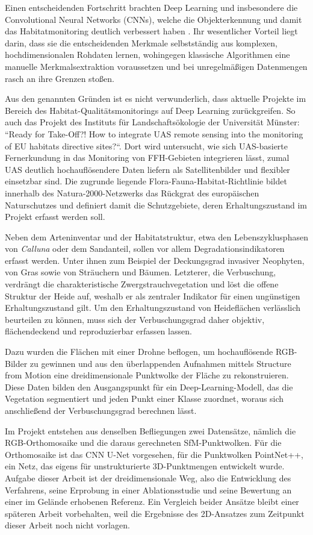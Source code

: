 Einen entscheidenden Fortschritt brachten Deep Learning und insbesondere die Convolutional Neural Networks (CNNs), welche die Objekterkennung und damit das Habitatmonitoring deutlich verbessert haben \cite{Yun.2024}. Ihr wesentlicher Vorteil liegt darin, dass sie die entscheidenden Merkmale selbstständig aus komplexen, hochdimensionalen Rohdaten lernen, wohingegen klassische Algorithmen eine manuelle Merkmalsextraktion voraussetzen und bei unregelmäßigen Datenmengen rasch an ihre Grenzen stoßen.

Aus den genannten Gründen ist es nicht verwunderlich, dass aktuelle Projekte im Bereich des Habitat-Qualitätsmonitorings auf Deep Learning zurückgreifen. So auch das Projekt des Instituts für Landschaftsökologie der Universität Münster: “Ready for Take-Off?! How to integrate UAS remote sensing into the monitoring of EU habitats directive sites?“. Dort wird untersucht, wie sich UAS-basierte Fernerkundung in das Monitoring von FFH-Gebieten integrieren lässt, zumal UAS deutlich hochauflösendere Daten liefern als Satellitenbilder und flexibler einsetzbar sind. Die zugrunde liegende Flora-Fauna-Habitat-Richtlinie bildet innerhalb des Natura-2000-Netzwerks das Rückgrat des europäischen Naturschutzes \cite{RatEG.1992} und definiert damit die Schutzgebiete, deren Erhaltungszustand im Projekt erfasst werden soll.

Neben dem Arteninventar und der Habitatstruktur, etwa den Lebenszyklusphasen von \textit{Calluna} oder dem Sandanteil, sollen vor allem Degradationsindikatoren erfasst werden. Unter ihnen zum Beispiel der Deckungsgrad invasiver Neophyten, von Gras sowie von Sträuchern und Bäumen. Letzterer, die Verbuschung, verdrängt die charakteristische Zwergstrauchvegetation und löst die offene Struktur der Heide auf, weshalb er als zentraler Indikator für einen ungünstigen Erhaltungszustand gilt. Um den Erhaltungszustand von Heideflächen verlässlich beurteilen zu können, muss sich der Verbuschungsgrad daher objektiv, flächendeckend und reproduzierbar erfassen lassen.

Dazu wurden die Flächen mit einer Drohne beflogen, um hochauflösende RGB-Bilder zu gewinnen und aus den überlappenden Aufnahmen mittels Structure from Motion eine dreidimensionale Punktwolke der Fläche zu rekonstruieren. Diese Daten bilden den Ausgangspunkt für ein Deep-Learning-Modell, das die Vegetation segmentiert und jeden Punkt einer Klasse zuordnet, woraus sich anschließend der Verbuschungsgrad berechnen lässt.

Im Projekt entstehen aus denselben Befliegungen zwei Datensätze, nämlich die
RGB-Orthomosaike und die daraus gerechneten SfM-Punktwolken. Für die
Orthomosaike ist das CNN U-Net vorgesehen, für die Punktwolken PointNet++, ein
Netz, das eigens für unstrukturierte 3D-Punktmengen entwickelt wurde. Aufgabe dieser Arbeit ist der dreidimensionale Weg, also die Entwicklung des Verfahrens, seine Erprobung in einer Ablationsstudie und seine Bewertung an einer im Gelände erhobenen Referenz. Ein Vergleich beider Ansätze bleibt einer späteren Arbeit vorbehalten, weil die Ergebnisse des 2D-Ansatzes zum Zeitpunkt dieser Arbeit noch nicht vorlagen.


